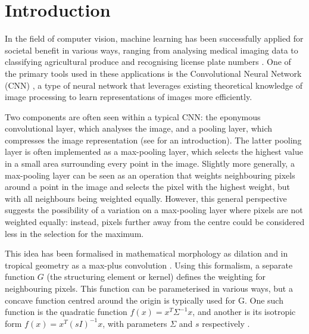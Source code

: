 \documentclass[a4paper, 12pt]{report}
\begin{document}
\tableofcontents


\chapter{Introduction}
In the field of computer vision, machine learning has been successfully applied for societal benefit in various ways, ranging from analysing medical imaging data \cite{esteva2021deep, jain2015computer} to classifying agricultural produce \cite{wan2020faster, sivaranjani2022overview} and recognising license plate numbers \cite{xie2018new}. One of the primary tools used in these applications is the Convolutional Neural Network (CNN) \cite{le1990handwritten}, a type of neural network that leverages existing theoretical knowledge of image processing to learn representations of images more efficiently.

Two components are often seen within a typical CNN: the eponymous convolutional layer, which analyses the image, and a pooling layer, which compresses the image representation (see \cite{introconvnets} for an introduction). The latter pooling layer is often implemented as a max-pooling layer, which selects the highest value in a small area surrounding every point in the image. Slightly more generally, a max-pooling layer can be seen as an operation that weights neighbouring pixels around a point in the image and selects the pixel with the highest weight, but with all neighbours being weighted equally. However, this general perspective suggests the possibility of a variation on a max-pooling layer where pixels are not weighted equally: instead, pixels further away from the centre could be considered less in the selection for the maximum.

This idea has been formalised in mathematical morphology as dilation \cite{heijmans1996morphological} and in tropical geometry as a max-plus convolution \cite{maragos}. Using this formalism, a separate function $G$ (the structuring element or kernel) defines the weighting for neighbouring pixels. This function can be parameterised in various ways, but a concave function centred around the origin is typically used for G. One such function is the quadratic function $f(x)=x^T\Sigma^{-1}x$, and another is its isotropic form $f(x)=x^T(sI)^{-1}x$, with parameters $\Sigma$ and $s$ respectively \cite{Boomgaard1999NumericalSS}.
\end{document}
